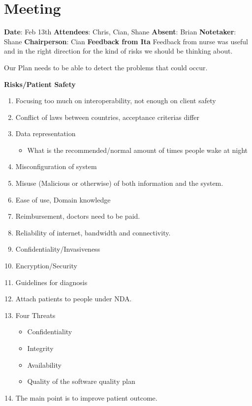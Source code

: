 \section{Meeting}
\textbf{Date}: Feb 13th\newline
\textbf{Attendees}: Chris, Cian, Shane\newline
\textbf{Absent}: Brian\newline
\textbf{Notetaker}: Shane\newline
\textbf{Chairperson}: Cian\newline \newline
\textbf{Feedback from Ita} \newline \newline
Feedback from nurse was useful and in the right direction for the kind of risks we should be thinking about.

Our Plan needs to be able to detect the problems that could occur.


\textbf{Risks/Patient Safety}
\begin{enumerate}
\item Focusing too much on interoperability, not enough on client safety
\item Conflict of laws between countries, acceptance criterias differ
\item Data representation
\begin{itemize}
\item What is the recommended/normal amount of times people wake at night
\end{itemize} 
\item Misconfiguration of system
\item Misuse (Malicious or otherwise) of both information and the system.
\item Ease of use, Domain knowledge
\item Reimbursement, doctors need to be paid.
\item Reliability of internet, bandwidth and connectivity.
\item Confidentiality/Invasiveness
\item Encryption/Security
\item Guidelines for diagnosis
\item Attach patients to people under NDA.
\item Four Threats
\begin{itemize}
\item Confidentiality
\item Integrity
\item Availability
\item Quality of the software quality plan
\end{itemize}
\item The main point is to improve patient outcome.
\end{enumerate}

